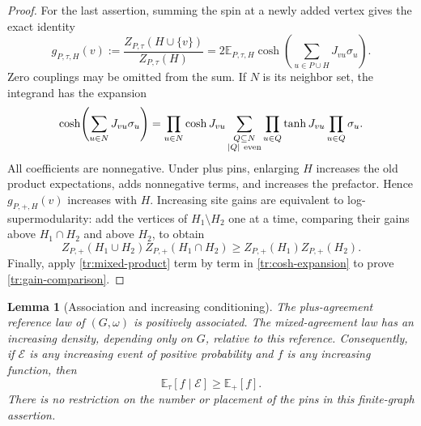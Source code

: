 \documentclass[11pt]{article}
\newtheorem{lemma}[theorem]{Lemma}
\theoremstyle{definition}
\theoremstyle{remark}
\numberwithin{equation}{section}
\begin{document}
\begin{proof}
For the last assertion, summing the spin at a newly added vertex gives the
exact identity
\begin{equation}
\label{tr:site-gain-formula}
 g_{P,\tau,H}(v):=
 \frac{Z_{P,\tau}(H\cup\{v\})}{Z_{P,\tau}(H)}
 =2\mathbb E_{P,\tau,H}
 \cosh\!\left(\sum_{u\in P\cup H}J_{vu}\sigma_u\right).
\end{equation}
Zero couplings may be omitted from the sum. If $N$ is its neighbor set,
the integrand has the expansion
\begin{equation}
\label{tr:cosh-expansion}
 \cosh\!\left(\sum_{u\in N}J_{vu}\sigma_u\right)
 =\prod_{u\in N}\cosh J_{vu}
 \sum_{\substack{Q\subseteq N\\ |Q|\ {\rm even}}}
 \prod_{u\in Q}\tanh J_{vu}\prod_{u\in Q}\sigma_u.
\end{equation}
All coefficients are nonnegative. Under plus pins, enlarging $H$ increases
the old product expectations, adds nonnegative terms, and increases the
prefactor. Hence $g_{P,+,H}(v)$ increases with $H$. Increasing site gains are
equivalent to log-supermodularity: add the vertices of $H_1\setminus H_2$
one at a time, comparing their gains above $H_1\cap H_2$ and above $H_2$,
to obtain
\[
 Z_{P,+}(H_1\cup H_2)Z_{P,+}(H_1\cap H_2)
 \geq Z_{P,+}(H_1)Z_{P,+}(H_2).
\]
Finally, apply \eqref{tr:mixed-product} term by term in
\eqref{tr:cosh-expansion} to prove \eqref{tr:gain-comparison}.
\end{proof}

\begin{lemma}[Association and increasing conditioning]
\label{tr:increasing-conditioning}
The plus-agreement reference law of $(G,\omega)$ is positively associated.
The mixed-agreement law has an increasing density, depending only on $G$,
relative to this reference. Consequently, if $\mathcal E$ is any increasing
event of positive probability and $f$ is any increasing function, then
\begin{equation}
\label{tr:conditional-reference}
 \mathbb E_\tau[f\mid\mathcal E]\geq\mathbb E_+[f].
\end{equation}
There is no restriction on the number or placement of the pins in this
finite-graph assertion.
\end{lemma}
\end{document}
